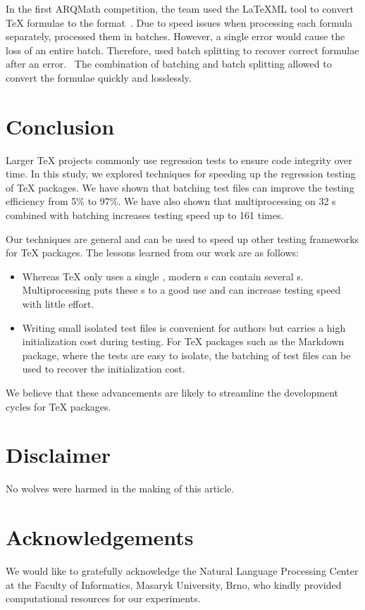 \documentclass[final]{ltugboat}
\begin{document}
In the first ARQMath competition, the  team used the \LaTeX ML tool to convert \TeX{} formulae to the  format~\cite[Section~2.2]{novotny2020three}. Due to speed issues when processing each formula separately,  processed them in batches. However, a single error would cause the loss of an entire batch. Therefore,  used batch splitting to recover correct formulae after an error.~\cite{novotny2020arqmath} The combination of batching and batch splitting allowed  to convert the formulae quickly and losslessly.

\section{Conclusion}
\label{sec:conclusion}

Larger \TeX{} projects commonly use regression tests to ensure code integrity over time.
In this study, we explored techniques for speeding up the regression testing of \TeX{} packages. We have shown that batching test files can improve the testing efficiency from 5\% to 97\%. We have also shown that multiprocessing on 32 s combined with batching increases testing speed up to 161 times.

Our techniques are general and can be used to speed up other testing frameworks for \TeX{} packages. The lessons learned from our work are as follows:
\begin{itemize}
\item Whereas \TeX{} only uses a single , modern s can contain several s. Multiprocessing puts these s to a good use and can increase testing speed with little effort.
\item Writing small isolated test files is convenient for authors but carries a high initialization cost during testing. For \TeX{} packages such as the Markdown package, where the tests are easy to isolate, the batching of test files can be used to recover the initialization cost.
\end{itemize}
We believe that these advancements are likely to streamline the development cycles for \TeX{} packages.

\medskip
\noindent


\section*{Disclaimer}
No wolves were harmed in the making of this article.

\section*{Acknowledgements}
We would like to gratefully acknowledge the Natural Language Processing Center at the Faculty of Informatics, Masaryk University, Brno, who kindly provided computational resources for our experiments.


\begingroup
\gappto{\UrlBreaks}{\UrlOrds}
\RaggedRight

\endgroup

\makesignature
\end{document}
